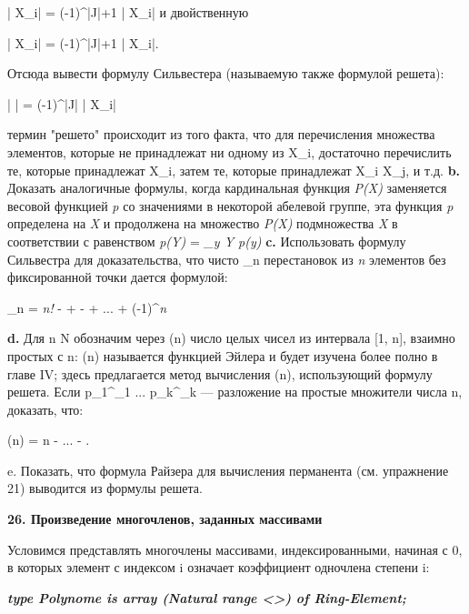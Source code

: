 | X_{i}| =  (-1)^{|J|+1 } | X_{i}| и двойственную

| X_{i}| =  (-1)^{|J|+1 } | X_{i}|.

Отсюда вывести формулу Сильвестера (называемую также формулой решета):

| | =  (-1)^{|J|} | X_{i}|

термин "решето" происходит из того факта, что для перечисления множества элементов, которые не принадлежат ни одному из X_{i}, достаточно перечислить те, которые принадлежат X_{i}, затем те, которые принадлежат X_{i} \cap X_{j}, и т.д.
\textbf{b.} Доказать аналогичные формулы, когда кардинальная функция \textit{P(X)} \rightarrow {}  заменяется весовой функцией \textit{p} со значениями в некоторой абелевой группе, эта функция \textit{p} определена на \textit{X} и продолжена на множество \textit{P(X)} подмножества \textit{X} в соответствии с равенством \textit{p(Y)} = \Sigma\textit{_{y \in Y} p(y)}
\textbf{c.} Использовать формулу Сильвестра для доказательства, что чисто \sigma_{n} перестановок из \textit{n} элементов без фиксированной точки дается формулой:

\sigma_{n} = \textit{n!}  -  +  -  + ... + (-1)^{\textit{n}}  \rgroup 

\textbf{d.} Для n \in N обозначим через \varphi (n) число целых чисел из интервала [1, n], взаимно простых с n: \varphi (n) называется функцией Эйлера и будет изучена более полно в главе IV; здесь предлагается метод вычисления \varphi (n), использующий формулу решета. Если p_{1}^{\alpha_{1}} ... p_{k}^{\alpha_{k}} — разложение на простые множители числа n, доказать, что:

\varphi (n) = n  -  \rgroup ...  -  \rgroup .

e. Показать, что формула Райзера для вычисления перманента (см. упражнение 21) выводится из формулы решета.

\textbf{26. Произведение многочленов, заданных массивами}

Условимся представлять многочлены массивами, индексированными, начиная с 0, в которых элемент с индексом i означает коэффициент одночлена степени i:

\textbf{\textit{type Polynome is array (Natural range <>) of Ring-Element;}}

